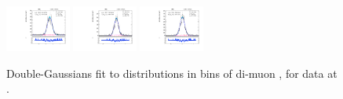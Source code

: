 \begin{figure}[htb]
\includegraphics[width=0.19\textwidth]{plots/Appendix_Recoil_Fits/ZmmData_PF_13TeV_2G_bkg/pfu1fit_32.pdf}
\includegraphics[width=0.19\textwidth]{plots/Appendix_Recoil_Fits/ZmmData_PF_13TeV_2G_bkg/pfu1fit_33.pdf}
\includegraphics[width=0.19\textwidth]{plots/Appendix_Recoil_Fits/ZmmData_PF_13TeV_2G_bkg/pfu1fit_34.pdf}
\caption{Double-Gaussians fit to \upar distributions in bins of di-muon \pt, for \zmm data at \serah.}
\label{fig:a:recoil:fit:data:u1:13}
\end{figure}